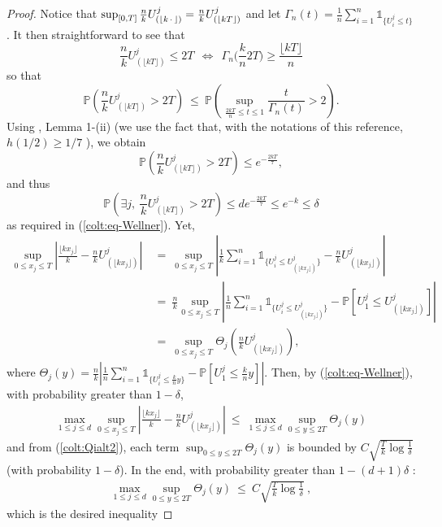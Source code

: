 \begin{proof}
  Notice that $\sup_{[0 , T]} \frac{n}{k} U_{(\lfloor k\,\cdot\,\rfloor )}^j =
  \frac{n}{k} U_{(\lfloor kT\rfloor )}^j $ and let $\Gamma_n(t) = \frac{1}{n}
  \sum_{i=1}^n \mathds{1}_{\{U_i^j \le t\}}$ . It then straightforward to see
  that 
\[ \frac{n}{k} U_{(\lfloor kT\rfloor )}^j \le 2T ~~\Leftrightarrow~~
  \Gamma_n\Big(\frac{k}{n} 2T\Big) \ge \frac{\lfloor kT\rfloor }{n} \]
 so that 
\[\mathbb{P}
  \left( \frac{n}{k} U_{(\lfloor kT\rfloor )}^j > 2T \right) ~\le~ \mathbb{P} \left
    ( \sup_{\frac{2kT}{n} \le t \le 1} \frac{t}{\Gamma_n(t)} > 2
  \right). \]
 Using \cite{Wellner78}, Lemma 1-(ii) (we use the fact that,   with
  the notations of this reference, $h(1/2) \ge 1/7$ ), we obtain 
\[\mathbb{P} \left( \frac{n}{k} U_{(\lfloor kT\rfloor )}^j > 2T \right) \le
  e^{-\frac{2kT}{7}}, \]
 and thus
 $$\mathbb{P} \left( \exists j,~
    \frac{n}{k} U_{(\lfloor kT\rfloor )}^j > 2T \right) \le de^{-\frac{2kT}{7}} \le
  e^{-k} \le \delta  %
  $$ as required in (\ref{colt:eq-Wellner}).  Yet,
\begin{align*}
\sup_{0 \le x_j \le T} \left| \frac{\lfloor kx_j\rfloor }{k} - \frac{n}{k} U_{(\lfloor kx_j\rfloor )}^j  \right| &~=~  \sup_{0 \le x_j \le T} \left| \frac{1}{k} \sum_{i=1}^n \mathds{1}_{\{ U_{i}^j \le U_{(\lfloor kx_j\rfloor )}^j   \}} - \frac{n}{k} U_{(\lfloor kx_j\rfloor )}^j  \right|\\
&~=~ \frac{n}{k} \sup_{0 \le x_j \le T} \left| \frac{1}{n} \sum_{i=1}^n \mathds{1}_{\{ U_{i}^j \le U_{(\lfloor kx_j\rfloor )}^j   \}} - \mathbb{P} \left [ U_1^j \le  U_{(\lfloor kx_j\rfloor )}^j \right] \right|\\
&~=~ \sup_{0 \le x_j \le T} \Theta_j (\frac{n}{k}U_{(\lfloor k x_j\rfloor )}^j ), 
\end{align*}
%
where $\Theta_j(y) = \frac{n}{k} %
\left| \frac{1}{n} \sum_{i=1}^n \mathds{1}_{\{ U_{i}^j \le \frac{k}{n}y   \}} - \mathbb{P} \left [ U_1^j \le \frac{k}{n} y \right] \right|$. 
Then, by (\ref{colt:eq-Wellner}), %
with probability greater than $1-\delta$,
\begin{align*}
  \max_{1 \le j \le d} 
\sup_{0 \le x_j \le T} \left| \frac{\lfloor kx_j\rfloor }{k}
    - \frac{n}{k} U_{(\lfloor kx_j\rfloor )}^j \right|
~\le~
 \max_{1 \le j \le d} 
 \sup_{0 \le y \le 2T} \Theta_j(y)
\end{align*}
and from (\ref{colt:Qialt2}), each term $\sup_{0 \le y \le 2T} \Theta_j(y)$
 is bounded by
$C\sqrt{\frac{T}{k}\log{\frac{1}{\delta}}}$ (with probability
$1-\delta$). In the end, 
 with probability greater than $1-(d+1) \delta$ :
\begin{align*}
\max_{1 \le j \le d} \sup_{0 \le y \le 2T} \Theta_j(y) ~\le~ C\sqrt{\frac{T}{k}\log{\frac{1}{\delta}}}~,
\end{align*}
which is  the desired inequality %
\end{proof}


